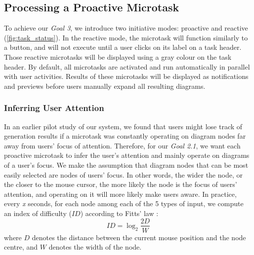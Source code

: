 \subsection{Processing a Proactive Microtask}
To achieve our \textit{Goal 3}, we introduce two initiative modes: proactive and reactive (\autoref{fig:task_status}). In the reactive mode, the microtask will function similarly to a button, and will not execute until a user clicks on its label on a task header. Those reactive microtasks will be displayed using a gray colour on the task header. By default, all microtasks are activated and run automatically in parallel with user activities.
Results of these microtasks will be displayed as notifications and previews before users manually expand all resulting diagrams.

\subsubsection{Inferring User Attention}
In an earlier pilot study of our system, we found that users might lose track of generation results if a microtask was constantly operating on diagram nodes far away from users' focus of attention. Therefore, for our \textit{Goal 2.1}, we want each proactive microtask to infer the user's attention and mainly operate on diagrams of a user's focus. We make the assumption that diagram nodes that can be most easily selected are nodes of users' focus. In other words, the wider the node, or the closer to the mouse cursor, the more likely the node is the focus of users' attention, and operating on it will more likely make users aware. In practice, every \textit{x} seconds, for each node among each of the 5 types of input, we compute an index of difficulty ($ID$) according to Fitts' law \cite{fitts1954information}:
\begin{equation*}
    ID = \log_2 \frac{2D}{W}
\end{equation*}
where $D$ denotes the distance between the current mouse position and the node centre, and $W$ denotes the width of the node.

